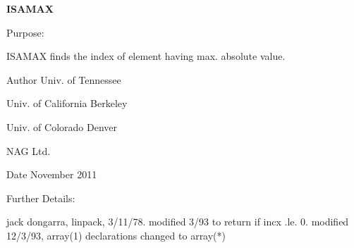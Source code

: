 {\bfseries I\+S\+A\+M\+A\+X} 

\begin{DoxyParagraph}{Purpose\+: }
\begin{DoxyVerb}    ISAMAX finds the index of element having max. absolute value.\end{DoxyVerb}
 
\end{DoxyParagraph}
\begin{DoxyAuthor}{Author}
Univ. of Tennessee 

Univ. of California Berkeley 

Univ. of Colorado Denver 

N\+A\+G Ltd. 
\end{DoxyAuthor}
\begin{DoxyDate}{Date}
November 2011 
\end{DoxyDate}
\begin{DoxyParagraph}{Further Details\+: }
\begin{DoxyVerb}     jack dongarra, linpack, 3/11/78.
     modified 3/93 to return if incx .le. 0.
     modified 12/3/93, array(1) declarations changed to array(*)\end{DoxyVerb}
 
\end{DoxyParagraph}
